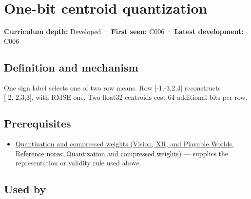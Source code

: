 \hypertarget{appendix-4ccd7a775813}{}\label{referencestart:appendix-4ccd7a775813}
\section{One-bit centroid quantization}\label{appendix-4ccd7a775813-one-bit-centroid-quantization}

\hypertarget{appendix-4ccd7a775813-one-bit-centroid-quantization}{}

\textbf{Curriculum depth:} Developed · \textbf{First seen:} C006 · \textbf{Latest development:} C006

\begin{allmightroledefinition}

\subsection{Definition and mechanism}\label{appendix-4ccd7a775813-definition-and-mechanism}

\hypertarget{appendix-4ccd7a775813-definition-and-mechanism}{}

One sign label selects one of two row means. Row {[}-1,-3,2,4{]} reconstructs {[}-2,-2,3,3{]}, with RMSE one. Two float32 centroids cost 64 additional bits per row.

\end{allmightroledefinition}

\subsection{Prerequisites}\label{appendix-4ccd7a775813-prerequisites}

\hypertarget{appendix-4ccd7a775813-prerequisites}{}

\begin{itemize}
\tightlist
\item
  \href{../07-Vision-XR-and-Playable-Worlds/main.pdf\#nameddest=appendix-fdc7879e8bf2}{Quantization and compressed weights (Vision, XR, and Playable Worlds, Reference notes: Quantization and compressed weights)} --- supplies the representation or validity rule used above.
\end{itemize}

\subsection{Used by}\label{appendix-4ccd7a775813-used-by}

\hypertarget{appendix-4ccd7a775813-used-by}{}

